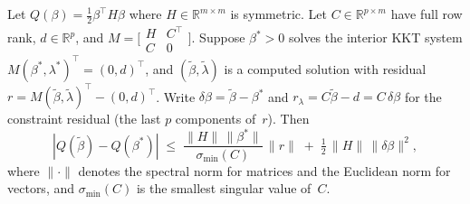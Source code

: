 
%

\begin{lemma}\label{lem:q-error-first-order}
Let $Q(\beta) = \tfrac{1}{2}\beta^\top H \beta$ where
$H \in \mathbb{R}^{m \times m}$ is symmetric.
Let $C \in \mathbb{R}^{p \times m}$ have full row rank,
$d \in \mathbb{R}^p$, and
$M = \bigl[\begin{smallmatrix} H & C^\top \\ C & 0 \end{smallmatrix}\bigr]$.
Suppose $\beta^* > 0$ solves the interior KKT system $M(\beta^*,\lambda^*)^\top = (0,d)^\top$,
and $(\tilde\beta, \tilde\lambda)$ is a computed solution with residual
$r = M(\tilde\beta,\tilde\lambda)^\top - (0,d)^\top$.
Write $\delta\beta = \tilde\beta - \beta^*$ and
$r_\lambda = C\tilde\beta - d = C\,\delta\beta$ for the
constraint residual (the last $p$ components of~$r$).
Then
\[
  |Q(\tilde\beta) - Q(\beta^*)|
  \;\leq\;
  \frac{\|H\|\,\|\beta^*\|}{\sigma_{\min}(C)}\,\|r\|
  \;+\; \tfrac{1}{2}\,\|H\|\,\|\delta\beta\|^2,
\]
where $\|\cdot\|$ denotes the spectral norm for matrices and the
Euclidean norm for vectors, and $\sigma_{\min}(C)$ is the smallest
singular value of~$C$.
\end{lemma}

